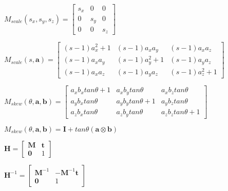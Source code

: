 \documentclass{article}
\def\lthtmlcheckvsize{\ifdim\ht\sizebox<\vsize 
  \ifdim\wd\sizebox<\hsize\expandafter\hfill\fi \expandafter\vfill
  \else\expandafter\vss\fi}%
\begin{document}
{\newpage\clearpage
{}%
$ M_{scale}(s_x,s_y,s_z) = \begin{bmatrix}
s_x & 0 & 0 \\
0 & s_y & 0 \\
0 & 0 & s_z
\end{bmatrix}
$%
\lthtmlindisplaymathZ
\lthtmlcheckvsize\clearpage}

{\newpage\clearpage
{}%
$ M_{scale}(s,\textbf{a}) = \begin{bmatrix}
(s-1)a_x^2 + 1 & (s-1)a_x a_y & (s-1) a_x a_z \\
(s-1)a_x a_y & (s-1) a_y^2 + 1 & (s-1)a_y a_z \\
(s-1)a_x a_z & (s-1) a_y a_z & (s-1)a_z^2 + 1
\end{bmatrix}
$%
\lthtmlindisplaymathZ
\lthtmlcheckvsize\clearpage}



\setlength{\extrarowheight}{10pt}%

\setlength{\extrarowheight}{10pt}
{\newpage\clearpage
{}%
$ M_{skew}(\theta, \textbf{a}, \textbf{b}) = \begin{bmatrix}
a_x b_x tan \theta + 1 & a_x b_y tan \theta & a_x b_z tan \theta \\
a_y b_x tan \theta & a_y b_y tan \theta + 1 & a_y b_z tan \theta \\
a_z b_x tan \theta & a_z b_y tan \theta & a_z b_z tan \theta + 1
\end{bmatrix}
$%
\lthtmlindisplaymathZ
\lthtmlcheckvsize\clearpage}

{\newpage\clearpage
{}%
$ M_{skew}(\theta, \textbf{a}, \textbf{b}) = \textbf{I} + tan \theta (\textbf{a} \otimes \textbf{b})$%
\lthtmlindisplaymathZ
\lthtmlcheckvsize\clearpage}

{\newpage\clearpage
{}%
$ \textbf{H} = \begin{bmatrix}\textbf{M} & \textbf{t} \\\textbf{0} & 1 \end{bmatrix} $%
\lthtmlindisplaymathZ
\lthtmlcheckvsize\clearpage}

{\newpage\clearpage
{}%
$ \textbf{H}^{-1} = \begin{bmatrix}
\textbf{M}^{-1} & -\textbf{M}^{-1}\textbf{t} \\\textbf{0} & 1 
\end{bmatrix} $%
\lthtmlindisplaymathZ
\lthtmlcheckvsize\clearpage}
\end{document}
